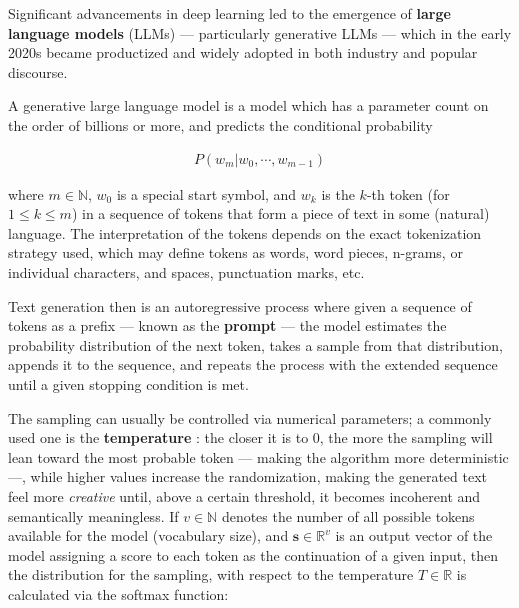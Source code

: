 \documentclass[noindent,nohyp,parspace,titlepage,twoside,12pt]{article}
\begin{document}
      Significant advancements in deep learning \cite{attention,gpt3,gpt4} led
      to the emergence of \textbf{large language models} (LLMs) --- particularly
      generative LLMs --- which in the early 2020s became productized and
      widely adopted in both industry and popular discourse.

      A generative large language model is a model which has a parameter count
      on the order of billions or more, and predicts the conditional
      probability \cite{llms}

      \begin{align} \label{eqautoreg}
        P(w_m | w_0, \cdots, w_{m-1})
      \end{align}

      where $m \in \mathbb{N}$, $w_0$ is a special start symbol, and $w_k$ is
      the $k$-th token (for $1 \le k \le m$) in a sequence of tokens that form
      a piece of text in some (natural) language. The interpretation of the
      tokens depends on the exact tokenization strategy used, which may define
      tokens as words, word pieces, n-grams, or individual characters, and
      spaces, punctuation marks, etc.

      Text generation then is an autoregressive process where given a
      sequence of tokens as a prefix --- known as the \textbf{prompt} --- the
      model estimates the probability distribution of the next token, takes a
      sample from that distribution, appends it to the sequence, and repeats
      the process with the extended sequence until a given stopping condition
      is met.

      The sampling can usually be controlled via numerical parameters; a
      commonly used one is the \textbf{temperature} \cite{temperature}: the
      closer it is to 0, the more the sampling will lean toward the most
      probable token --- making the algorithm more deterministic ---, while
      higher values increase the randomization, making the generated text feel
      more \emph{creative} until, above a certain threshold, it becomes
      incoherent and semantically meaningless. If $v \in \mathbb{N}$ denotes
      the number of all possible tokens available for the model (vocabulary
      size), and $\mathbf{s} \in \mathbb{R}^v$ is an output vector of the model
      assigning a score to each token as the continuation of a given input,
      then the distribution for the sampling, with respect to the temperature
      $T \in \mathbb{R}$ is calculated via the softmax function:
\end{document}
